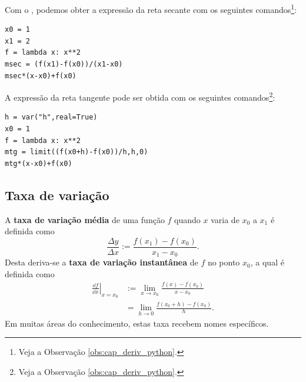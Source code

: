 \begin{ex}
  \ifispython
  Com o \sympy, podemos obter a expressão da reta secante com os seguintes comandos\footnote{Veja a Observação \ref{obs:cap_deriv_python}.}:
\begin{verbatim}
x0 = 1
x1 = 2
f = lambda x: x**2
msec = (f(x1)-f(x0))/(x1-x0)
msec*(x-x0)+f(x0)
\end{verbatim}
A expressão da reta tangente pode ser obtida com os seguintes comandos\footnote{Veja a Observação \ref{obs:cap_deriv_python}.}:
\begin{verbatim}
h = var("h",real=True)
x0 = 1
f = lambda x: x**2
mtg = limit((f(x0+h)-f(x0))/h,h,0)
mtg*(x-x0)+f(x0)
\end{verbatim}
  \fi
\end{ex}

\subsection{Taxa de variação}

A {\bf taxa de variação média} de uma função $f$ quando $x$ varia de $x_0$ a $x_1$ é definida como
\begin{equation}
  \frac{\Delta y}{\Delta x} := \frac{f(x_1)-f(x_0)}{x_1-x_0}. 
\end{equation}
Desta deriva-se a {\bf taxa de variação instantânea} de $f$ no ponto $x_0$, a qual é definida como
\begin{align}
  \left.\frac{\dd f}{\dd x}\right|_{x=x_0} &:= \lim_{x\to x_0} \frac{f(x)-f(x_0)}{x-x_0}\\
                             &= \lim_{h\to 0} \frac{f(x_0+h)-f(x_0)}{h}.
\end{align}
Em muitas áreas do conhecimento, estas taxa recebem nomes específicos.

